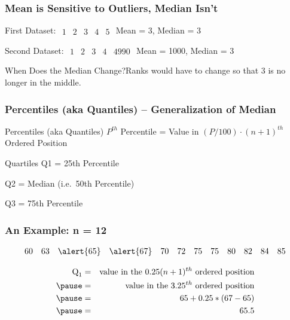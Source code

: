 \documentclass[handout]{beamer}
\begin{document}
\begin{frame}
\frametitle{Mean is Sensitive to Outliers, Median Isn't}

\begin{block}{First Dataset: $\begin{array}{ccccc}1& 2& 3& 4& 5\end{array}$}
Mean = 3, Median = 3
\end{block}
\pause

\begin{block}{Second Dataset: $\begin{array}{ccccc}1& 2& 3& 4& 4990\end{array}$}
Mean = 1000, Median = 3
\end{block}
\pause
\begin{alertblock}{When Does the Median Change?}Ranks would have to change so that 3 is no longer in the middle.\end{alertblock}

\end{frame}
\begin{frame}
\frametitle{Percentiles (aka Quantiles) -- Generalization of Median}
\begin{center} \end{center}
\vspace{1.5em}
\begin{block}{Percentiles (aka Quantiles)}
$P^{th}$ Percentile = Value in  $\left(P/100\right)\cdot (n+1)^{th}$ Ordered Position
\end{block}
\pause
\begin{block}{Quartiles}
Q1 = 25th Percentile

Q2 =  Median (i.e.\ 50th Percentile)

Q3 = 75th Percentile
\end{block}

\end{frame}


\begin{frame}
\frametitle{An Example: n = 12}
$$\begin{array}{cccccccccccc}
60&63&\alert{65}&\alert{67}&70&72&75&75&80&82&84&85
\end{array}$$

\begin{eqnarray*}\mbox{Q}_1 &=& \mbox{value in the } 0.25(n+1)^{th}\mbox{ ordered position}\\\pause
	&=& \mbox{value in the } 3.25^{th}\mbox{ ordered position}\\\pause
	&=& 65 + 0.25 * (67 - 65)\\\pause
	&=& 65.5
\end{eqnarray*}
\end{frame}
\end{document}
